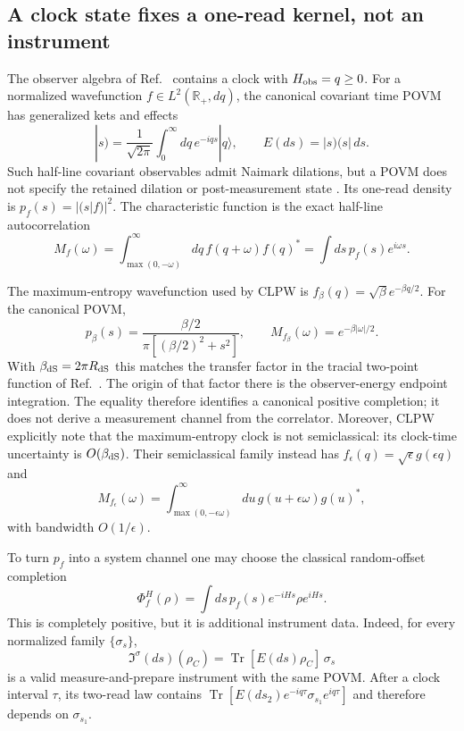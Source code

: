\documentclass[11pt]{article}
\newcommand{\Tr}{\operatorname{Tr}}
\begin{document}
\subsection*{A clock state fixes a one-read kernel, not an instrument}
The observer algebra of Ref.~\citep{CLPW} contains a clock with
$H_{\rm obs}=q\geq0$.  For a normalized wavefunction
$f\in L^2(\mathbb R_+,dq)$, the canonical covariant time POVM has generalized
kets and effects
\begin{equation}
 |s)=\frac{1}{\sqrt{2\pi}}\int_0^\infty dq\,e^{-iqs}|q\rangle,
 \qquad E(ds)=|s)(s|\,ds .
 \label{eq:clockpovm}
\end{equation}
Such half-line covariant observables admit Naimark dilations, but a POVM does
not specify the retained dilation or post-measurement state
\citep{EgusquizaMuga1999,LeppajarviSedlak2020}.  Its one-read density is
$p_f(s)=|(s|f)|^2$.  The characteristic function is the exact half-line
autocorrelation
\begin{equation}
 M_f(\omega)
 =\int_{\max(0,-\omega)}^\infty dq\,f(q+\omega)f(q)^*
 =\int ds\,p_f(s)e^{i\omega s}.
 \label{eq:clockoverlap}
\end{equation}

The maximum-entropy wavefunction used by CLPW is
$f_\beta(q)=\sqrt\beta e^{-\beta q/2}$.  For the canonical POVM,
\begin{equation}
 p_\beta(s)=\frac{\beta/2}{\pi[(\beta/2)^2+s^2]},
 \qquad M_{f_\beta}(\omega)=e^{-\beta|\omega|/2}.
 \label{eq:clockcauchy}
\end{equation}
With $\beta_{\rm dS}=2\pi R_{\rm dS}$ this matches the transfer factor in the
tracial two-point function of Ref.~\citep{ChenStanfordTangYang2026}.  The
origin of that factor there is the observer-energy endpoint integration.  The
equality therefore identifies a canonical positive completion; it does not
derive a measurement channel from the correlator.  Moreover, CLPW explicitly
note that the maximum-entropy clock is not semiclassical: its clock-time
uncertainty is $O(\beta_{\rm dS})$.  Their semiclassical family instead has
$f_\epsilon(q)=\sqrt\epsilon g(\epsilon q)$ and
\begin{equation}
 M_{f_\epsilon}(\omega)
 =\int_{\max(0,-\epsilon\omega)}^\infty du\,
 g(u+\epsilon\omega)g(u)^*,
 \label{eq:semiclassicaloverlap}
\end{equation}
with bandwidth $O(1/\epsilon)$.

To turn $p_f$ into a system channel one may choose the classical random-offset
completion
\begin{equation}
 \Phi_f^H(\rho)=\int ds\,p_f(s)e^{-iHs}\rho e^{iHs}.
 \label{eq:clockchannel}
\end{equation}
This is completely positive, but it is additional instrument data.  Indeed,
for every normalized family $\{\sigma_s\}$,
\begin{equation}
 \mathfrak I^\sigma(ds)(\rho_C)
 =\Tr[E(ds)\rho_C]\,\sigma_s
 \label{eq:clockinstrument}
\end{equation}
is a valid measure-and-prepare instrument with the same POVM.  After a clock
interval $\tau$, its two-read law contains
$\Tr[E(ds_2)e^{-iq\tau}\sigma_{s_1}e^{iq\tau}]$ and therefore depends on
$\sigma_{s_1}$.
\end{document}
